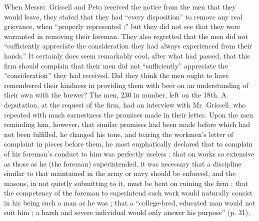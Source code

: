 When Messrs. Grissell and Peto received the notice from the men that
they would leave, they stated that they had ``every disposition'' to
remove any real grievance, when ``properly represented ;'' but they did
not see that they were warranted in removing their foreman. They also
regretted that the men did not ``sufficiently appreciate the
consideration they had always experienced from their hands.'' It
certainly does seem remarkably cool, after what had passed, that this
firm should complain that their men did not ``sufficiently'' appreciate
the ``consideration'' they had received. Did they think the men ought to
have remembered their kindness in providing them with beer on an
understanding of their own with the brewer? The men, 230 in number,
left on the 18th. A deputation, at the request of the firm, had an
interview with Mr. Grissell, who repeated with much earnestness the
promises made in their letter. Upon the men reminding him, however, that
similar promises had been made before which had not been fulfilled, he
changed his tone, and tearing the workmen's letter of complaint in
pieces before them, he most emphatically declared that to complain of
his foreman's conduct to him was perfectly useless ; that on works so
extensive as those as he (the foreman) superintended, it was necessary
that a discipline similar to that maintained in the army or navy should
be enforced, and the masons, in not quietly submitting to it, must be
bent on ruining the firm ; that the competency of the foreman to
superintend such work would naturally consist in his being such a man as
he was ; that a ``college-bred, educated man would not suit him ; a
harsh and severe individual would only answer his purpose'' (p. 31).

